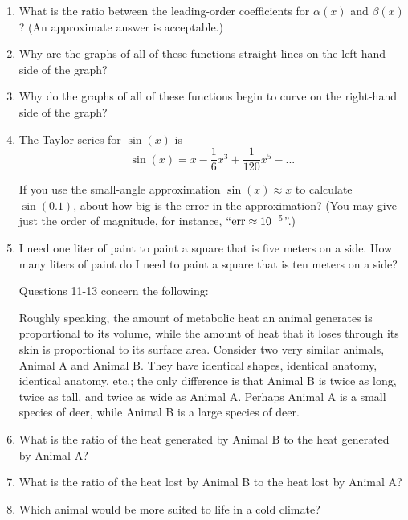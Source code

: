 \documentclass[12pt]{article}
\begin{document}
\begin{enumerate}
\item{What is the ratio between the leading-order coefficients for $\alpha(x)$ and $\beta(x)$? (An approximate answer is acceptable.)}
\vspace{1in}

\item{Why are the graphs of all of these functions straight lines on the left-hand side of the graph?}
\vspace{1in}

\item{Why do the graphs of all of these functions begin to curve on the right-hand side of the graph?}
\vspace{1in}



\item{The Taylor series for $\sin(x)$ is $$\sin(x) = x - \frac{1}{6}x^3 + \frac{1}{120}x^5 - ...$$

If you use the small-angle approximation $\sin(x) \approx x$ to calculate $\sin(0.1)$, about how big is the error in the approximation? (You may give just the order of magnitude, for instance, ``${\rm err} \approx 10^{-5}$''.)}

\vspace{1in}


\item{I need one liter of paint to paint a square that is five meters on a side. How many liters of paint do I need to paint a square that is ten meters on a side?}

\vspace{1in}

Questions 11-13 concern the following:

Roughly speaking, the amount of metabolic heat an animal generates is proportional to its volume, while the amount of heat that it loses through its skin is proportional to its surface area. Consider two very similar animals, Animal A and Animal B.
They have identical shapes, identical anatomy, identical anatomy, etc.; the only difference is that Animal B is twice as long, twice as tall, and twice as wide as Animal A. Perhaps Animal A is a small species of deer, while Animal B is a large 
species of deer.



\item{What is the ratio of the heat generated by Animal B to the heat generated by Animal A?}

\vspace{1in}

\item{What is the ratio of the heat lost by Animal B to the heat lost by Animal A?}
\vspace{1in}


\item{Which animal would be more suited to life in a cold climate?}
\vspace{1in}


\end{enumerate}
\end{document}
